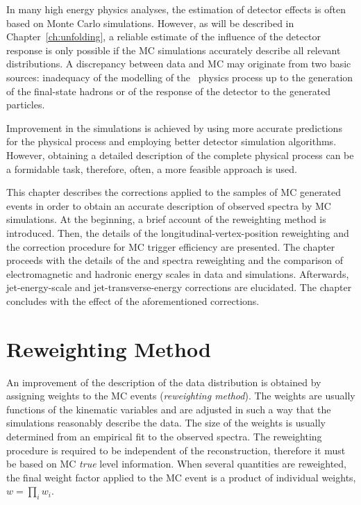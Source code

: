 In many high energy physics analyses, the estimation of detector effects is often based on Monte Carlo simulations. However, as will be described in Chapter~\ref{ch:unfolding}, a reliable estimate of the influence of the detector response is only possible if the MC simulations accurately describe all relevant distributions. %
 A discrepancy between data and MC may originate from two basic sources: inadequacy of the modelling of the \ep~physics process up to the generation of the final-state hadrons or of the response of the detector to the generated particles.
 
Improvement in the simulations is achieved by using more accurate predictions for the physical process and employing better detector simulation algorithms. However, obtaining a detailed description of the complete physical process can be a formidable task, therefore, often, a more feasible approach is used.

This chapter describes the corrections applied to the samples of MC generated events in order to obtain an accurate description of observed spectra by MC simulations. At the beginning, a brief account of the reweighting method is introduced. Then, the details of the longitudinal-vertex-position reweighting and the correction procedure for MC trigger efficiency are presented. The chapter proceeds with the details of the \qsq and \etjetb spectra reweighting and the comparison of electromagnetic and hadronic energy scales in data and simulations. Afterwards, jet-energy-scale and jet-transverse-energy corrections are elucidated. The chapter concludes with the effect of the aforementioned corrections.

\section{Reweighting Method}

An improvement of the description of the data distribution is obtained by assigning weights to the MC events (\emph{reweighting method}). The weights are usually functions of the kinematic variables and are adjusted in such a way that the simulations reasonably describe the data. The size of the weights is usually determined from an empirical fit to the observed spectra. The reweighting procedure is required to be independent of the reconstruction, therefore it must be based on MC \emph{true} level information. When several quantities are reweighted, the final weight factor applied to the MC event is a product of individual weights, $w = \prod_i w_i$. 

